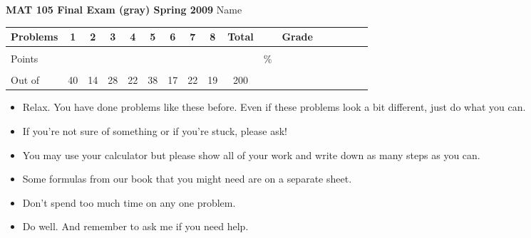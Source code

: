 \documentclass[12pt]{article}
\begin{document}
{\bf MAT 105 Final Exam (gray) Spring 2009} \hspace{.4in} {\large Name} \hrulefill

\hspace{.2in}

\begin{center}

\begin{tabular}
{|l|c|c|c|c|c|c|c|c|c|c|c|c|c|c|c|c|} \hline

 Problems & \hspace{5 pt} 1 \hspace{5 pt}  & \hspace{5 pt} 2 \hspace{5 pt} & \hspace{5 pt} 3 \hspace{5 pt} & \hspace{5 pt} 4 \hspace{5 pt}& \hspace{5 pt} 5 \hspace{5 pt} & \hspace{5 pt} 6 \hspace{5 pt} & \hspace{5 pt} 7 \hspace{5 pt}   & \hspace{5 pt} 8 \hspace{5 pt} &  \hspace{5 pt} Total  \hspace{5 pt} & &  \hspace{5 pt} Grade \hspace{5 pt}  \\ \hline
&&&&&&&&&&&\\  
Points &&&&&&&&&&   \hspace{.6in}\% &  \\ 
&&&&&&&&&&& \\  \hline
Out of & 40  & 14 & 28 & 22 & 38 & 17 & 22 & 19 &200 & & \\ \hline

\end {tabular}
 
\end{center}

\hspace{.2in}

\begin{itemize}
\item Relax.  You have done problems like these before. Even if these problems look a bit different, just do what you can. 
\item  If you're not sure of something or if you're stuck, please ask! 
\item You may use your calculator but please show all of your work and write down as many steps as you can.  
\item Some formulas from our book that you might need are on a separate sheet.
\item Don't spend too much time on any one problem.
\item  Do well.  And remember to ask me if you need help.
\end{itemize}
\end{document}
